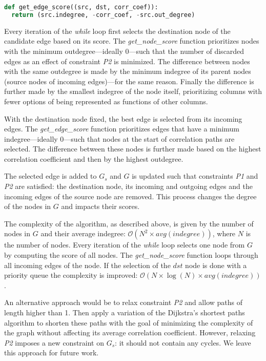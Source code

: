 \begin{lstlisting}[language=Python,
label={lst:ps:corr:edgescore},
caption={get\_edge\_score}]
def get_edge_score((src, dst, corr_coef)):
  return (src.indegree, -corr_coef, -src.out_degree)
\end{lstlisting}
\bigskip

Every iteration of the \textit{while} loop first selects the destination node of the candidate edge based on its score. The \textit{get\_node\_score} function prioritizes nodes with the minimum outdegree---ideally 0---such that the number of discarded edges as an effect of constraint \textit{P2} is minimized. The difference between nodes with the same outdegree is made by the minimum indegree of its parent nodes (source nodes of incoming edges)---for the same reason. Finally the difference is further made by the smallest indegree of the node itself, prioritizing columns with fewer options of being represented as functions of other columns. 

With the destination node fixed, the best edge is selected from its incoming edges. The \textit{get\_edge\_score} function prioritizes edges that have a minimum indegree---ideally 0---such that nodes at the start of correlation paths are selected. The difference between these nodes is further made based on the highest correlation coefficient and then by the highest outdegree.

The selected edge is added to \(G_{s}\) and \(G\) is updated such that constraints \textit{P1} and \textit{P2} are satisfied: the destination node, its incoming and outgoing edges and the incoming edges of the source node are removed. This process changes the degree of the nodes in \(G\) and impacts their scores.

The complexity of the algorithm, as described above, is given by the number of nodes in \(G\) and their average indegree: \(\mathcal{O}(N^2 \times avg(indegree))\), where \(N\) is the number of nodes. Every iteration of the \textit{while} loop selects one node from \(G\) by computing the score of all nodes. The \textit{get\_node\_score} function loops through all incoming edges of the node. If the selection of the \(dst\) node is done with a priority queue the complexity is improved: \(\mathcal{O}(N \times \log(N) \times avg(indegree))\).

An alternative approach would be to relax constraint \textit{P2} and allow paths of length higher than 1. Then apply a variation of the Dijkstra's shortest paths algorithm to shorten these paths with the goal of minimizing the complexity of the graph without affecting its average correlation coefficient. However, relaxing  \textit{P2} imposes a new constraint on \(G_{s}\): it should not contain any cycles. We leave this approach for future work.

